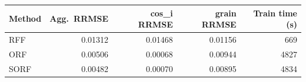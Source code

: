 \begin{tabular}{lrrrr}
\toprule
Method & Agg.\ RRMSE & cos\_i RRMSE & grain RRMSE & Train time (s) \\
\midrule
RFF & 0.01312 & 0.01468 & 0.01156 & 669 \\
ORF & 0.00506 & 0.00068 & 0.00944 & 4827 \\
SORF & 0.00482 & 0.00070 & 0.00895 & 4834 \\
\bottomrule
\end{tabular}
